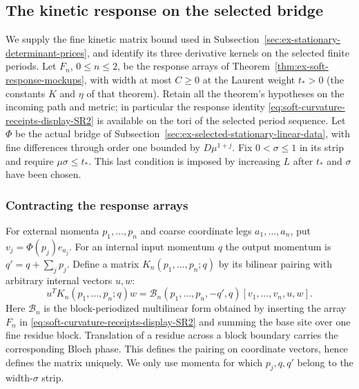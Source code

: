 \subsection{The kinetic response on the selected bridge}
\label{sec:ex-selected-kinetic-response}

We supply the fine kinetic matrix bound used in
Subsection~\ref{sec:ex-stationary-determinant-prices}, and identify its
three derivative kernels on the selected finite periods. Let
$F_n$, $0\leq n\leq2$, be the response arrays of
Theorem~\ref{thm:ex-soft-response-mockups}, with width at most
$C\geq0$ at the Laurent weight $t_*>0$ (the constants $K$ and $\eta$
of that theorem). Retain all the theorem's hypotheses on the incoming
path and metric; in particular the response identity \eqref{eq:soft-curvature-receipts-display-SR2} is
available on the tori of the selected period sequence. Let $\Phi$ be the actual bridge
of Subsection~\ref{sec:ex-selected-stationary-linear-data}, with fine
differences through order one bounded by $D\mu^{1+j}$.
Fix $0<\sigma\leq1$ in its strip and require
$\mu\sigma\leq t_*$. This last condition is imposed by increasing
$L$ after $t_*$ and $\sigma$ have been chosen.

\subsubsection{Contracting the response arrays}
For external momenta $p_1,\ldots,p_n$ and coarse coordinate legs
$a_1,\ldots,a_n$, put $v_j=\Phi(p_j)e_{a_j}$. For an internal
input momentum $q$ the output momentum is
$q'=q+\sum_jp_j$. Define a matrix $K_n(p_1,\ldots,p_n;q)$
by its bilinear pairing with arbitrary internal vectors $u,w$:
\[
 u^T K_n(p_1,\ldots,p_n;q)w
 =\mathcal B_n(p_1,\ldots,p_n,-q',q)
                         [v_1,\ldots,v_n,u,w].
\]
Here $\mathcal B_n$ is the block-periodized multilinear form
obtained by inserting the array $F_n$ in \eqref{eq:soft-curvature-receipts-display-SR2} and summing the
base site over one fine residue block. Translation of a residue
across a block boundary carries the corresponding Bloch phase.
This defines the pairing on coordinate vectors, hence defines
the matrix uniquely. We only use momenta for which $p_j,q,q'$
belong to the width-$\sigma$ strip.

